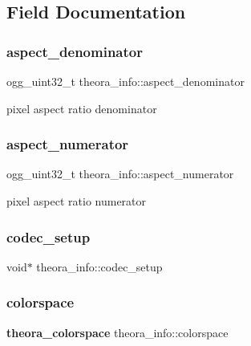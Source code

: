 \subsection{Field Documentation}
\mbox{\label{structtheora__info_afebc4d0cbfb34b68c833a8c79e83ae12}} 
\subsubsection{aspect\+\_\+denominator}
{\footnotesize\ttfamily ogg\+\_\+uint32\+\_\+t theora\+\_\+info\+::aspect\+\_\+denominator}



pixel aspect ratio denominator 

\mbox{\label{structtheora__info_a5a3ed8c79815fba1aa06c3f7d8e48b35}} 
\subsubsection{aspect\+\_\+numerator}
{\footnotesize\ttfamily ogg\+\_\+uint32\+\_\+t theora\+\_\+info\+::aspect\+\_\+numerator}



pixel aspect ratio numerator 

\mbox{\label{structtheora__info_a719a1d77a4a3bfeab79aa5747dbbb04c}} 
\subsubsection{codec\+\_\+setup}
{\footnotesize\ttfamily void$\ast$ theora\+\_\+info\+::codec\+\_\+setup}

\mbox{\label{structtheora__info_a5eaba99c96706d47b426ab7b7602dc5d}} 
\subsubsection{colorspace}
{\footnotesize\ttfamily \textbf{ theora\+\_\+colorspace} theora\+\_\+info\+::colorspace}



